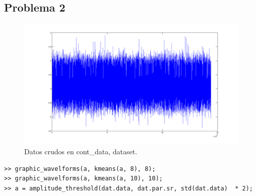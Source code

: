 \documentclass[a4paper,spanish]{article}
\begin{document}






\subsection{Problema 2}


\begin{figure}[htc]
	\centering
	\includegraphics[width=1.0\textwidth]{imgs/raw_cont_data.png}
	\caption{Datos crudos en cont\_data, dataset.}
	\label{fig3}
\end{figure}

\begin{verbatim}
>> graphic_wavelforms(a, kmeans(a, 8), 8);                           
>> graphic_wavelforms(a, kmeans(a, 10), 10);
>> a = amplitude_threshold(dat.data, dat.par.sr, std(dat.data)  * 2); 
\end{verbatim}
\end{document}
